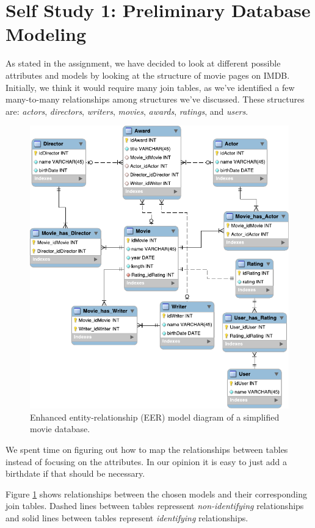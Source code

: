 
\section{Self Study 1: Preliminary Database Modeling}
As stated in the assignment, we have decided to look at different possible attributes and models by looking at the structure of movie pages on IMDB\@. Initially, we think it would require many join tables, as we've identified a few many-to-many relationships among structures we've discussed. These structures are: \emph{actors}, \emph{directors}, \emph{writers}, \emph{movies}, \emph{awards}, \emph{ratings}, and \emph{users}.

\begin{figure}[H]
  \centering
  \includegraphics[width=\linewidth]{1-06.02.14/selfStudy1db.pdf}
  \caption{Enhanced entity-relationship (EER) model diagram of a simplified movie database.}\label{fig:model}
\end{figure}

We spent time on figuring out how to map the relationships between tables
instead of focusing on the attributes. In our opinion it is easy to just add a
birthdate if that should be necessary.

Figure \ref{fig:model} shows relationships between the chosen models and their
corresponding join tables. Dashed lines between tables repressent
\emph{non-identifying} relationships and
solid lines between tables represent \emph{identifying} relationships.

